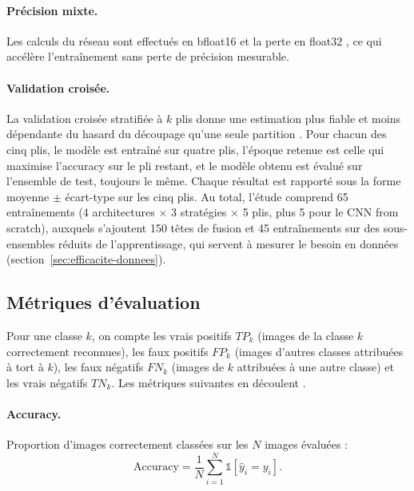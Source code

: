 \paragraph{Précision mixte.} Les calculs du réseau sont effectués en bfloat16 et la perte en float32 \cite{micikevicius2018mixed}, ce qui accélère l'entraînement sans perte de précision mesurable.

\paragraph{Validation croisée.} La validation croisée stratifiée à $k$ plis donne une estimation plus fiable et moins dépendante du hasard du découpage qu'une seule partition \cite{kohavi1995study}. Pour chacun des cinq plis, le modèle est entraîné sur quatre plis, l'époque retenue est celle qui maximise l'accuracy sur le pli restant, et le modèle obtenu est évalué sur l'ensemble de test, toujours le même. Chaque résultat est rapporté sous la forme moyenne $\pm$ écart-type sur les cinq plis. Au total, l'étude comprend 65 entraînements (4 architectures $\times$ 3 stratégies $\times$ 5 plis, plus 5 pour le CNN from scratch), auxquels s'ajoutent 150 têtes de fusion et 45 entraînements sur des sous-ensembles réduits de l'apprentissage, qui servent à mesurer le besoin en données (section~\ref{sec:efficacite-donnees}).

\subsection{Métriques d'évaluation}
\label{sec:metriques}

Pour une classe $k$, on compte les vrais positifs $TP_k$ (images de la classe $k$ correctement reconnues), les faux positifs $FP_k$ (images d'autres classes attribuées à tort à $k$), les faux négatifs $FN_k$ (images de $k$ attribuées à une autre classe) et les vrais négatifs $TN_k$. Les métriques suivantes en découlent \cite{sokolova2009systematic}.

\paragraph{Accuracy.} Proportion d'images correctement classées sur les $N$ images évaluées :
\begin{equation}
\mathrm{Accuracy} = \frac{1}{N}\sum_{i=1}^{N} \mathbb{1}\left[\hat{y}_i = y_i\right].
\end{equation}

